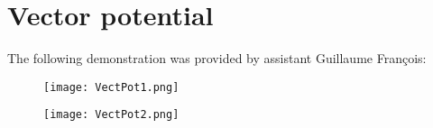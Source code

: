 \label{apdxB}

\section{Vector potential}

The following demonstration was provided by assistant Guillaume François: 

\begin{figure}[H]
    \centering
    \texttt{[image: VectPot1.png]}
\end{figure}
\begin{figure}[H]
    \centering
    \texttt{[image: VectPot2.png]}
\end{figure}
\label{apdxC}

\unappendix
